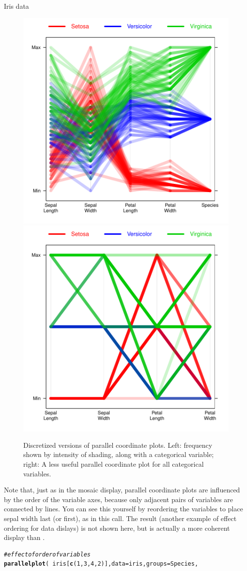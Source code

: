 \documentclass[11pt]{book}\usepackage[]{graphicx}\usepackage[]{color}
\makeatletter
\newcommand{\hlnum}[1]{\textcolor[rgb]{0.686,0.059,0.569}{#1}}%
\newcommand{\hlcom}[1]{\textcolor[rgb]{0.678,0.584,0.686}{\textit{#1}}}%
\newcommand{\hlopt}[1]{\textcolor[rgb]{0,0,0}{#1}}%
\newcommand{\hlstd}[1]{\textcolor[rgb]{0.345,0.345,0.345}{#1}}%
\newcommand{\hlkwc}[1]{\textcolor[rgb]{0.333,0.667,0.333}{#1}}%
\newcommand{\hlkwd}[1]{\textcolor[rgb]{0.737,0.353,0.396}{\textbf{#1}}}%
\newenvironment{kframe}{%
 \def\at@end@of@kframe{}%
 \ifinner\ifhmode%
  \def\at@end@of@kframe{\end{minipage}}%
  \begin{minipage}{\columnwidth}%
 \fi\fi%
 \def\FrameCommand##1{\hskip\@totalleftmargin \hskip-\fboxsep
 \colorbox{shadecolor}{##1}\hskip-\fboxsep
     \hskip-\linewidth \hskip-\@totalleftmargin \hskip\columnwidth}%
 \MakeFramed {\advance\hsize-\width
   \@totalleftmargin\z@ \linewidth\hsize
   \@setminipage}}%
 {\par\unskip\endMakeFramed%
 \at@end@of@kframe}
\newenvironment{knitrout}{}{} %
\renewenvironment{knitrout}{\small\renewcommand{\baselinestretch}{.85}}{} %
\makeatother
\begin{document}
\begin{Example}[iris1]{Iris data}
\begin{figure}
\centering
\includegraphics[width=.49\textwidth]{ch05/fig/iris2a}
\includegraphics[width=.49\textwidth]{ch05/fig/iris2b}
\caption{Discretized versions of parallel coordinate plots.
Left: frequency shown by intensity of shading, along with a categorical variable;
right: A less useful parallel coordinate plot for all categorical variables.}
\label{fig:iris2}
\end{figure}
Note that, just as in the mosaic display, parallel coordinate plots
are influenced by the order of the variable axes, because only
adjacent pairs of variables are connected by lines.  You can see this yourself
by reordering the  variables to place sepal width last (or first),
as in this call.  The result (another example of effect ordering for data dislays)
is not shown here, but is actually a more coherent
display than .
\begin{knitrout}
\color{fgcolor}\begin{kframe}
\begin{alltt}
\hlcom{# effect of order of variables}
\hlkwd{parallelplot}\hlstd{(}\hlopt{~}\hlstd{iris[}\hlkwd{c}\hlstd{(}\hlnum{1}\hlstd{,}\hlnum{3}\hlstd{,}\hlnum{4}\hlstd{,}\hlnum{2}\hlstd{)],} \hlkwc{data}\hlstd{=iris,} \hlkwc{groups} \hlstd{= Species,}

\end{alltt}
\end{kframe}
\end{knitrout}
\end{Example}
\end{document}
